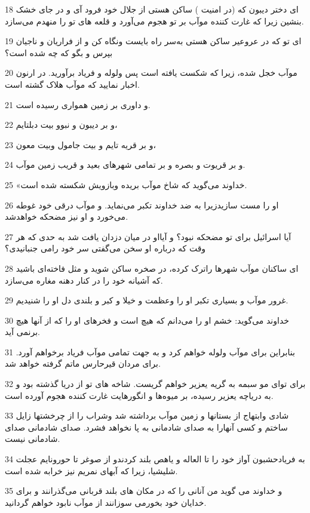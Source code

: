 \par 18 ‌ای دختر دیبون که (در امنیت ) ساکن هستی از جلال خود فرود آی و در جای خشک بنشین زیرا که غارت کننده موآب بر تو هجوم می‌آورد و قلعه های تو را منهدم می‌سازد.
\par 19 ‌ای تو که در عروعیر ساکن هستی به‌سر راه بایست ونگاه کن و از فراریان و ناجیان بپرس و بگو که چه شده است؟
\par 20 موآب خجل شده، زیرا که شکست یافته است پس ولوله و فریاد برآورید. در ارنون اخبار نمایید که موآب هلاک گشته است.
\par 21 و داوری بر زمین همواری رسیده است.
\par 22 و بر دیبون و نبوو بیت دبلتایم،
\par 23 و بر قریه تایم و بیت جامول وبیت معون،
\par 24 و بر قریوت و بصره و بر تمامی شهرهای بعید و قریب زمین موآب.
\par 25 «خداوند می‌گوید که شاخ موآب بریده وبازویش شکسته شده است.
\par 26 او را مست سازیدزیرا به ضد خداوند تکبر می‌نماید. و موآب درقی خود غوطه می‌خورد و او نیز مضحکه خواهدشد.
\par 27 آیا اسرائیل برای تو مضحکه نبود؟ و آیااو در میان دزدان یافت شد به حدی که هر وقت که درباره او سخن می‌گفتی سر خود رامی جنبانیدی؟
\par 28 ‌ای ساکنان موآب شهرها راترک کرده، در صخره ساکن شوید و مثل فاخته‌ای باشید که آشیانه خود را در کنار دهنه مغاره می‌سازد.
\par 29 غرور موآب و بسیاری تکبر او را وعظمت و خیلا و کبر و بلندی دل او را شنیدیم.
\par 30 خداوند می‌گوید: خشم او را می‌دانم که هیچ است و فخرهای او را که از آنها هیچ برنمی آید.
\par 31 بنابراین برای موآب ولوله خواهم کرد و به جهت تمامی موآب فریاد برخواهم آورد. برای مردان قیرحارس ماتم گرفته خواهد شد.
\par 32 برای تو‌ای مو سبمه به گریه یعزیر خواهم گریست. شاخه های تو از دریا گذشته بود و به دریاچه یعزیر رسیده، بر میوه‌ها و انگورهایت غارت کننده هجوم آورده است.
\par 33 شادی وابتهاج از بستانها و زمین موآب برداشته شد وشراب را از چرخشتها زایل ساختم و کسی آنهارا به صدای شادمانی به پا نخواهد فشرد. صدای شادمانی صدای شادمانی نیست.
\par 34 به فریادحشبون آواز خود را تا العاله و یاهص بلند کردندو از صوغر تا حورونایم عجلت شلیشیا، زیرا که آبهای نمریم نیز خرابه شده است.
\par 35 و خداوند می گوید من آنانی را که در مکان های بلند قربانی می‌گذرانند و برای خدایان خود بخورمی سوزانند از موآب نابود خواهم گردانید.
